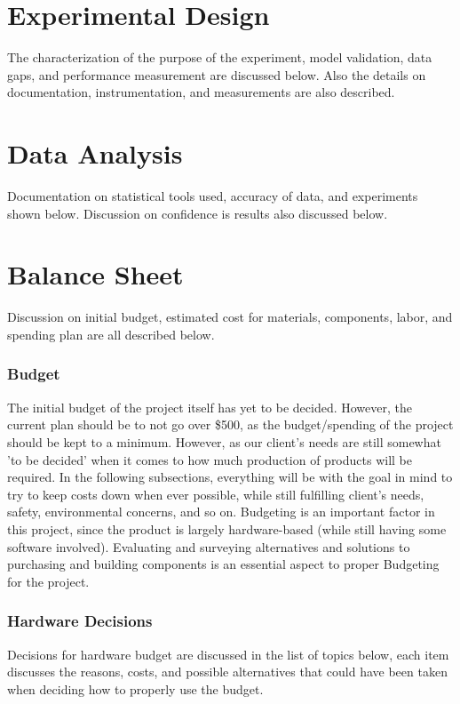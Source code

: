 \documentclass[12pt]{article}
\begin{document}
{	\newpage

\section{Experimental Design}
	The characterization of the purpose of the experiment, model validation, data gaps, and performance measurement are discussed below. Also the details on documentation, instrumentation, and measurements are also described.
  	
	\newpage	
  	
\section{Data Analysis}
	Documentation on statistical tools used, accuracy of data, and experiments shown below. Discussion on confidence is results also discussed below.

	\newpage

\section{Balance Sheet}
Discussion on initial budget, estimated cost for materials, components, labor, and spending plan are all described below.

		\subsubsection{Budget}
		The initial budget of the project itself has yet to be decided. However, the current plan should be to not go over \$500, as the budget/spending of the project should be kept to a minimum. However, as our client's needs are still somewhat 'to be decided' when it comes to how much production of products will be required. In the following subsections, everything will be with the goal in mind to try to keep costs down when ever possible, while still fulfilling client's needs, safety, environmental concerns, and so on. Budgeting is an important factor in this project, since the product is largely hardware-based (while still having some software involved). Evaluating and surveying alternatives and solutions to purchasing and building components is an essential aspect to proper Budgeting for the project.
		
		\subsubsection{Hardware Decisions}
		Decisions for hardware budget are discussed in the list of topics below, each item discusses the reasons, costs, and possible alternatives that could have been taken when deciding how to properly use the budget.

}
\end{document}
